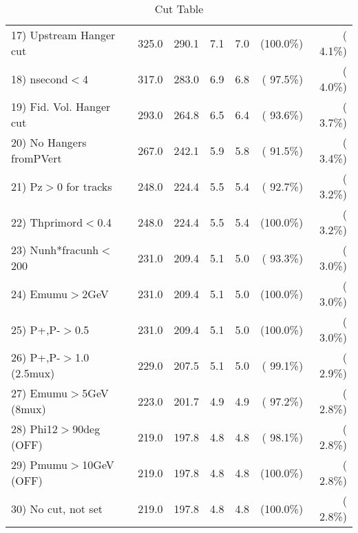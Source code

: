 \begin{table}[h!]
\begin{tabular}{||l||r|r|r|r|r|r||}
 17) Upstream Hanger cut  &        325.0 &        290.1 &          7.1 &          7.0 & (100.0\%) & (  4.1\%) \\
 18) nsecond$<$4          &        317.0 &        283.0 &          6.9 &          6.8 & ( 97.5\%) & (  4.0\%) \\
 19) Fid. Vol. Hanger cut &        293.0 &        264.8 &          6.5 &          6.4 & ( 93.6\%) & (  3.7\%) \\
 20) No Hangers fromPVert &        267.0 &        242.1 &          5.9 &          5.8 & ( 91.5\%) & (  3.4\%) \\
 21) Pz$>$0 for tracks    &        248.0 &        224.4 &          5.5 &          5.4 & ( 92.7\%) & (  3.2\%) \\
 22) Thprimord$<$0.4      &        248.0 &        224.4 &          5.5 &          5.4 & (100.0\%) & (  3.2\%) \\
 23) Nunh*fracunh$<$200   &        231.0 &        209.4 &          5.1 &          5.0 & ( 93.3\%) & (  3.0\%) \\
 24) Emumu$>$2GeV         &        231.0 &        209.4 &          5.1 &          5.0 & (100.0\%) & (  3.0\%) \\
 25) P+,P-$>$0.5          &        231.0 &        209.4 &          5.1 &          5.0 & (100.0\%) & (  3.0\%) \\
 26) P+,P-$>$1.0 (2.5mux) &        229.0 &        207.5 &          5.1 &          5.0 & ( 99.1\%) & (  2.9\%) \\
 27) Emumu$>$5GeV  (8mux) &        223.0 &        201.7 &          4.9 &          4.9 & ( 97.2\%) & (  2.8\%) \\
 28) Phi12$>$90deg  (OFF) &        219.0 &        197.8 &          4.8 &          4.8 & ( 98.1\%) & (  2.8\%) \\
 29) Pmumu$>$10GeV  (OFF) &        219.0 &        197.8 &          4.8 &          4.8 & (100.0\%) & (  2.8\%) \\
 30) No cut, not set      &        219.0 &        197.8 &          4.8 &          4.8 & (100.0\%) & (  2.8\%) \\
 \hline
 \hline
 \end{tabular}
 \caption{Cut Table           }
 \label{tab-cutcohjpsi-mumu_cohpip}
 \end{table}
